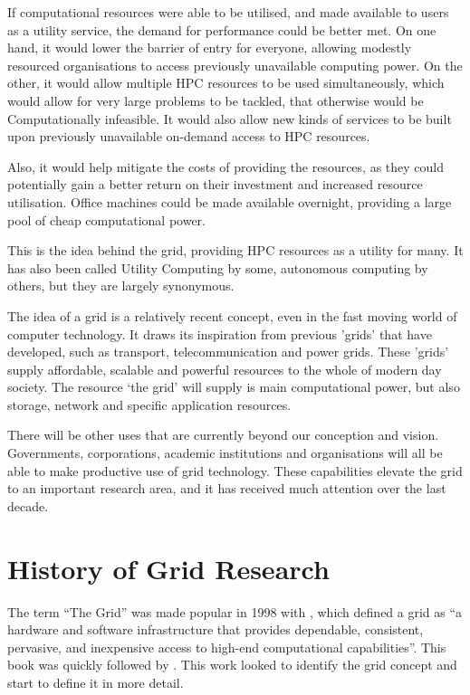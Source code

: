 If computational resources were able to be utilised, and made available to
users as a utility service, the demand for performance could be better met.  On
one hand, it would lower the barrier of entry for everyone, allowing modestly
resourced organisations to access previously unavailable computing power. On
the other, it would allow multiple HPC resources to be used simultaneously,
which would allow for very large problems to be tackled, that otherwise would
be Computationally infeasible. It would also allow new kinds of services to be
built upon previously unavailable on-demand access to HPC resources.  

Also, it would help mitigate the costs of providing the resources, as they
could potentially gain a better return on their investment and increased
resource utilisation. Office machines could be made available overnight,
providing a large pool of cheap computational power.

This is the idea behind the grid, providing HPC resources as a utility for
many.  It has also been called Utility Computing by some, autonomous
computing by others, but they are largely synonymous.

The idea of a grid is a relatively recent concept, even in the fast moving
world of computer technology.  It draws its inspiration from previous 'grids'
that have developed, such as transport, telecommunication and power grids.
These 'grids' supply affordable, scalable and powerful resources to the whole
of modern day society. The resource `the grid' will supply is main computational
power, but also storage, network and specific application resources.

There will be other uses that are currently beyond our conception and vision.
Governments, corporations, academic institutions and organisations will all be
able to make productive use of grid technology.  These capabilities elevate the
grid to an important research area, and it has received much attention over the
last decade.





\section{History of Grid Research}
\label{SEC:GRID:HISTORY}

The term ``The Grid'' was made popular in 1998 with
\cite{grid-foster99-blueprint}, which defined a grid as ``a hardware and
software infrastructure that provides dependable, consistent, pervasive, and
inexpensive access to high-end computational capabilities''.  This book was
quickly followed by \cite{grid-foster01-anatomy} .  This work looked to
identify the grid concept and start to define it in more detail.

